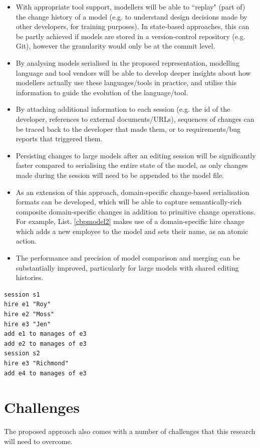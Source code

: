 \documentclass{llncs}
\begin{document}
\begin{itemize}
\item With appropriate tool support, modellers will be able to ``replay" (part of) the change history of a model (e.g. to understand design decisions made by other developers, for training purposes). In state-based approaches, this can be partly achieved if models are stored in a version-control repository (e.g. Git), however the granularity would only be at the commit level.
\item By analysing models serialised in the proposed representation, modelling language and tool vendors will be able to develop deeper insights about how modellers actually use these languages/tools in practice, and utilise this information to guide the evolution of the language/tool.
\item By attaching additional information to each session (e.g. the id of the developer, references to external documents/URLs), sequences of changes can be traced back to the developer that made them, or to requirements/bug reports that triggered them.
\item Persisting changes to large models after an editing session will be significantly faster compared to serialising the entire state of the model, as only changes made during the session will need to be appended to the model file.
\item As an extension of this approach, domain-specific change-based serialisation formats can be developed, which will be able to capture semantically-rich composite domain-specific changes in addition to primitive change operations. For example, List. \ref{cbpmodel2} makes use of a domain-specific hire change which adds a new employee to the model and sets their name, as an atomic action.
\item The performance and precision of model comparison and merging can be substantially improved, particularly for large models with shared editing histories.
\end{itemize}

\begin{lstlisting}[style=cbp,caption={Language-specific change-based representation of the model of Figure \ref{image1}.},label=cbpmodel2]
session s1
hire e1 "Roy"
hire e2 "Moss"
hire e3 "Jen"
add e1 to manages of e3
add e2 to manages of e3
session s2
hire e3 "Richmond"
add e4 to manages of e3
\end{lstlisting}

\section{Challenges}
\label{Challenges}
The proposed approach also comes with a number of challenges that this research will need to overcome.
\end{document}
